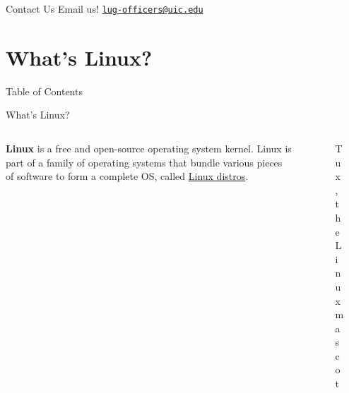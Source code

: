 \documentclass{beamer}
\begin{document}
\begin{frame}{Contact Us}
	\Huge Email us!
	\href{mailto:lug-officers@uic.edu}{\texttt{lug-officers@uic.edu}}
\end{frame}

\section{What's Linux?}
\begin{frame}{Table of Contents}
	\tableofcontents[currentsection]
\end{frame}

\begin{frame}{What's Linux?}
	\begin{columns}
		\begin{column}{0.5\textwidth}
			\textbf{Linux} is a free and open-source operating
			system kernel. Linux is part of a family of operating
			systems that bundle various pieces of software to form
			a complete OS, called \underline{Linux distros}.
		\end{column}
		\begin{column}{0.5\textwidth}
			\begin{figure}
				\centering
				
				\caption{Tux, the Linux mascot}
			\end{figure}
		\end{column}
	\end{columns}
\end{frame}
\end{document}
